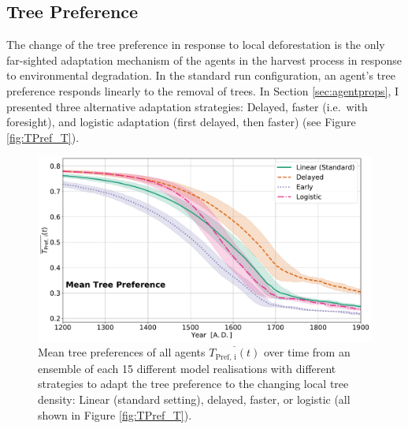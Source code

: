 \subsection{Tree Preference}

The change of the tree preference in response to local deforestation is the only far-sighted adaptation mechanism of the agents in the harvest process in response to environmental degradation.
In the standard run configuration, an agent's tree preference responds linearly to the removal of trees.
In Section \ref{sec:agentprops}, I presented three alternative adaptation strategies: Delayed, faster (i.e.\ with foresight), and logistic adaptation (first delayed, then faster) (see Figure \ref{fig:TPref_T}).
\begin{figure}
	\centering
	\includegraphics[width=1\linewidth]{images/Results/TPref/TPrefAdaption_TPref}
	\caption{Mean tree preferences of all agents $\overline{T_\text{Pref, i}(t)}$ over time from an ensemble of each 15 different model realisations with different strategies to adapt the tree preference to the changing local tree density: Linear (standard setting), delayed, faster, or logistic (all shown in Figure \ref{fig:TPref_T}).}
	\label{fig:tprefadaptiontpref}
\end{figure}
